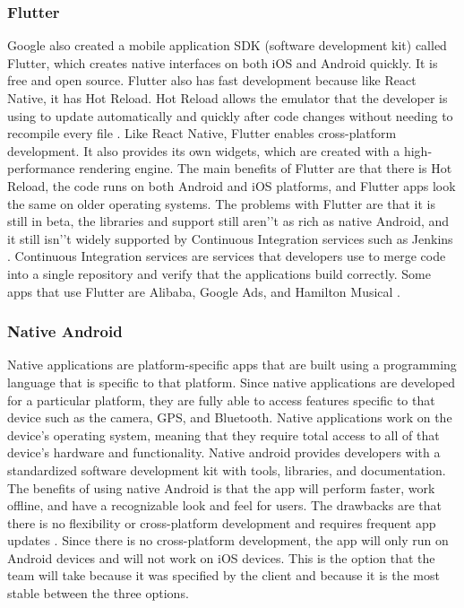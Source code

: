 \documentclass[onecolumn, draftclsnofoot,10pt, compsoc]{IEEEtran}
\begin{document}
\subsubsection{Flutter}
Google also created a mobile application SDK (software development kit) called Flutter, which creates native interfaces on both iOS and Android quickly. It is free and open source. Flutter also has fast development because like React Native, it has Hot Reload. Hot Reload allows the emulator that the developer is using to update automatically and quickly after code changes without needing to recompile every file \cite{W-flutter}. Like React Native, Flutter enables cross-platform development. It also provides its own widgets, which are created with a high-performance rendering engine. The main benefits of Flutter are that there is Hot Reload, the code runs on both Android and iOS platforms, and Flutter apps look the same on older operating systems. The problems with Flutter are that it is still in beta, the libraries and support still aren'’t as rich as native Android, and it still isn’'t widely supported by Continuous Integration services such as Jenkins \cite{W-flutter2}. Continuous Integration services are services that developers use to merge code into a single repository and verify that the applications build correctly. Some apps that use Flutter are Alibaba, Google Ads, and Hamilton Musical \cite {W-flutter3}.

\subsubsection{Native Android}
Native applications are platform-specific apps that are built using a programming language that is specific to that platform. Since native applications are developed for a particular platform, they are fully able to access features specific to that device such as the camera, GPS, and Bluetooth. Native applications work on the device’s operating system, meaning that they require total access to all of that device’s hardware and functionality. Native android provides developers with a standardized software development kit with tools, libraries, and documentation. The benefits of using native Android is that the app will perform faster, work offline, and have a recognizable look and feel for users. The drawbacks are that there is no flexibility or cross-platform development and requires frequent app updates \cite{W-nativeAndroid}. Since there is no cross-platform development, the app will only run on Android devices and will not work on iOS devices. This is the option that the team will take because it was specified by the client and because it is the most stable between the three options.
\end{document}
